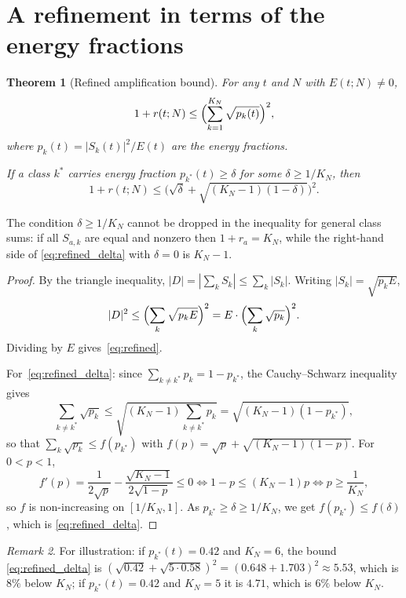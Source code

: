\documentclass[11pt]{amsart}
\newtheorem{theorem}{Theorem}[section]
\theoremstyle{definition}
\theoremstyle{remark}
\newtheorem{remark}[theorem]{Remark}
\begin{document}
\section{A refinement in terms of the energy fractions}
\label{sec:thm4}

\begin{theorem}[Refined amplification bound]\label{thm:refined}
For any $t$ and $N$ with $E(t;N)\ne0$,
\begin{equation}\label{eq:refined}
  1 + r(t;N) \le \Bigl(\sum_{k=1}^{K_N} \sqrt{p_k(t)}\Bigr)^2,
\end{equation}
where $p_k(t) = |S_k(t)|^2 / E(t)$ are the energy fractions.

If a class $k^*$ carries energy fraction $p_{k^*}(t) \ge \delta$ for some
$\delta\ge 1/K_N$, then
\begin{equation}\label{eq:refined_delta}
  1 + r(t;N) \le \bigl(\sqrt{\delta} +
    \sqrt{(K_N-1)(1-\delta)}\bigr)^2.
\end{equation}
\end{theorem}

The condition $\delta\ge1/K_N$ cannot be dropped in the inequality for general class
sums: if all $S_{a,k}$ are equal and nonzero then $1+r_a=K_N$, while the right-hand side of
\eqref{eq:refined_delta} with $\delta=0$ is $K_N-1$.

\begin{proof}
By the triangle inequality,
$|D| = |\sum_k S_k| \le \sum_k |S_k|$.
Writing $|S_k| = \sqrt{p_k E}$,
\[
  |D|^2 \le \Bigl(\sum_k \sqrt{p_k E}\Bigr)^2
  = E \cdot \Bigl(\sum_k \sqrt{p_k}\Bigr)^2.
\]
Dividing by $E$ gives~\eqref{eq:refined}.

For~\eqref{eq:refined_delta}: since
$\sum_{k \ne k^*} p_k = 1 - p_{k^*}$, the Cauchy--Schwarz inequality gives
\[
  \sum_{k \ne k^*} \sqrt{p_k}
  \le \sqrt{(K_N-1)\sum_{k \ne k^*} p_k}
  = \sqrt{(K_N-1)(1-p_{k^*})},
\]
so that $\sum_k\sqrt{p_k}\le f(p_{k^*})$ with
$f(p)=\sqrt p+\sqrt{(K_N-1)(1-p)}$.  For $0<p<1$,
\[
  f'(p)=\frac1{2\sqrt p}-\frac{\sqrt{K_N-1}}{2\sqrt{1-p}}\le0
  \iff 1-p\le (K_N-1)p\iff p\ge\frac1{K_N},
\]
so $f$ is non-increasing on $[1/K_N,1]$.  As
$p_{k^*}\ge\delta\ge1/K_N$, we get $f(p_{k^*})\le f(\delta)$, which is
\eqref{eq:refined_delta}.
\end{proof}

\begin{remark}\label{rem:refinement_numerical}
For illustration: if $p_{k^*}(t)=0.42$ and $K_N = 6$, the bound
\eqref{eq:refined_delta} is
$(\sqrt{0.42} + \sqrt{5 \cdot 0.58})^2 = (0.648 + 1.703)^2\approx 5.53$,
which is $8\%$ below $K_N$; if $p_{k^*}(t)=0.42$ and $K_N = 5$ it is
$4.71$, which is $6\%$ below $K_N$.
\end{remark}
\end{document}
